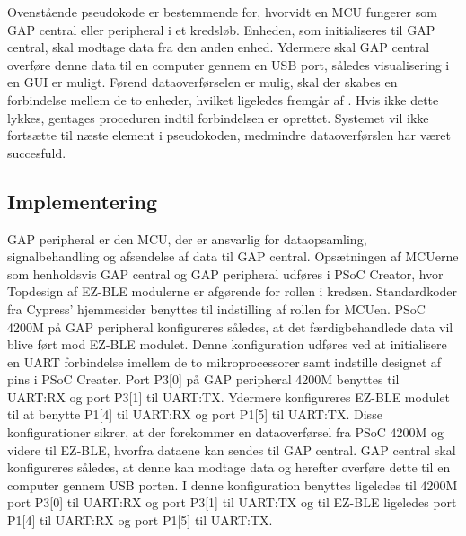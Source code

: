Ovenstående pseudokode er bestemmende for, hvorvidt en MCU fungerer som GAP central eller peripheral i et kredsløb. Enheden, som initialiseres til GAP central, skal modtage data fra den anden enhed. Ydermere skal GAP central overføre denne data til en computer gennem en USB port, således visualisering i en GUI er muligt. \newline
Førend dataoverførselen er mulig, skal der skabes en forbindelse mellem de to enheder, hvilket ligeledes fremgår af . Hvis ikke dette lykkes, gentages proceduren indtil forbindelsen er oprettet. %
Systemet vil ikke fortsætte til næste element i pseudokoden, medmindre dataoverførslen har været succesfuld.  

\subsection{Implementering}
GAP peripheral er den MCU, der er ansvarlig for dataopsamling, signalbehandling og afsendelse af data til GAP central. Opsætningen af MCUerne som henholdsvis GAP central og GAP peripheral udføres i PSoC Creator, hvor Topdesign af EZ-BLE modulerne er afgørende for rollen i kredsen. Standardkoder fra Cypress' hjemmesider benyttes til indstilling af rollen for MCUen. \newline
PSoC 4200M på GAP peripheral konfigureres således, at det færdigbehandlede data vil blive ført mod EZ-BLE modulet. Denne konfiguration udføres ved at initialisere en UART forbindelse imellem de to mikroprocessorer samt indstille designet af pins i PSoC Creater. %
Port P3[0] på GAP peripheral 4200M benyttes til UART:RX og port P3[1] til UART:TX. Ydermere konfigureres EZ-BLE modulet til at benytte P1[4] til UART:RX og port P1[5] til UART:TX. Disse konfigurationer sikrer, at der forekommer en dataoverførsel fra PSoC 4200M og videre til EZ-BLE, hvorfra dataene kan sendes til GAP central. \citep{Semiconductor20164200M} \newline
GAP central skal konfigureres således, at denne kan modtage data og herefter overføre dette til en computer gennem USB porten. I denne konfiguration benyttes ligeledes til 4200M port P3[0] til UART:RX og port P3[1] til UART:TX og til EZ-BLE ligeledes port P1[4] til UART:RX og port P1[5] til UART:TX. 

